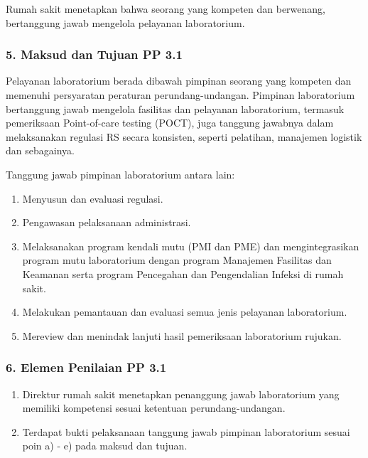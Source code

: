\documentclass[
]{book}
\providecommand{\tightlist}{%
  \setlength{\itemsep}{0pt}\setlength{\parskip}{0pt}}
\begin{document}
Rumah sakit menetapkan bahwa seorang yang kompeten dan berwenang, bertanggung jawab mengelola pelayanan laboratorium.

\hypertarget{maksud-dan-tujuan-pp-3.1}{%
\subsubsection*{5. Maksud dan Tujuan PP 3.1}\label{maksud-dan-tujuan-pp-3.1}}

Pelayanan laboratorium berada dibawah pimpinan seorang yang kompeten dan memenuhi persyaratan peraturan perundang-undangan. Pimpinan laboratorium bertanggung jawab mengelola fasilitas dan pelayanan laboratorium, termasuk pemeriksaan Point-of-care testing (POCT), juga tanggung jawabnya dalam melaksanakan regulasi RS secara konsisten, seperti pelatihan, manajemen logistik dan sebagainya.

Tanggung jawab pimpinan laboratorium antara lain:

\begin{enumerate}
\def\labelenumi{\alph{enumi}.}
\tightlist
\item
  Menyusun dan evaluasi regulasi.
\item
  Pengawasan pelaksanaan administrasi.
\item
  Melaksanakan program kendali mutu (PMI dan PME) dan mengintegrasikan program mutu laboratorium dengan program Manajemen Fasilitas dan Keamanan serta program Pencegahan dan Pengendalian Infeksi di rumah sakit.
\item
  Melakukan pemantauan dan evaluasi semua jenis pelayanan laboratorium.
\item
  Mereview dan menindak lanjuti hasil pemeriksaan laboratorium rujukan.
\end{enumerate}

\hypertarget{elemen-penilaian-pp-3.1}{%
\subsubsection*{6. Elemen Penilaian PP 3.1}\label{elemen-penilaian-pp-3.1}}

\begin{enumerate}
\def\labelenumi{\alph{enumi}.}
\tightlist
\item
  Direktur rumah sakit menetapkan penanggung jawab laboratorium yang memiliki kompetensi sesuai ketentuan perundang-undangan.
\item
  Terdapat bukti pelaksanaan tanggung jawab pimpinan laboratorium sesuai poin a) - e) pada maksud dan tujuan.
\end{enumerate}
\end{document}
